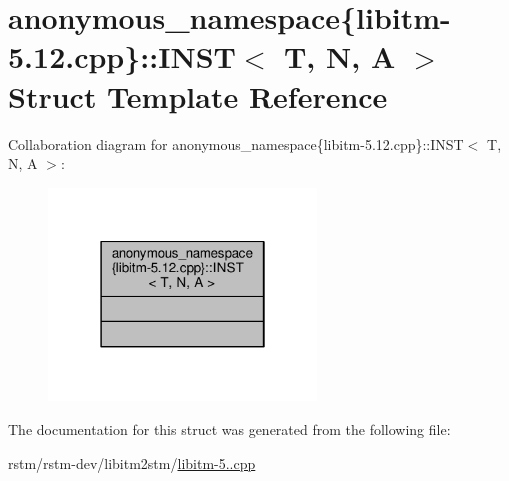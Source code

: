 \hypertarget{structanonymous__namespace_02libitm-5_812_8cpp_03_1_1INST}{\section{anonymous\-\_\-namespace\{libitm-\/5.12.cpp\}\-:\-:I\-N\-S\-T$<$ T, N, A $>$ Struct Template Reference}
\label{structanonymous__namespace_02libitm-5_812_8cpp_03_1_1INST}
}


Collaboration diagram for anonymous\-\_\-namespace\{libitm-\/5.12.cpp\}\-:\-:I\-N\-S\-T$<$ T, N, A $>$\-:
\nopagebreak
\begin{figure}[H]
\begin{center}
\leavevmode
\includegraphics[width=202pt]{structanonymous__namespace_02libitm-5_812_8cpp_03_1_1INST__coll__graph}
\end{center}
\end{figure}


The documentation for this struct was generated from the following file\-:\begin{DoxyCompactItemize}
\item 
rstm/rstm-\/dev/libitm2stm/\hyperlink{libitm-5_812_8cpp}{libitm-\/5..\-cpp}\end{DoxyCompactItemize}
